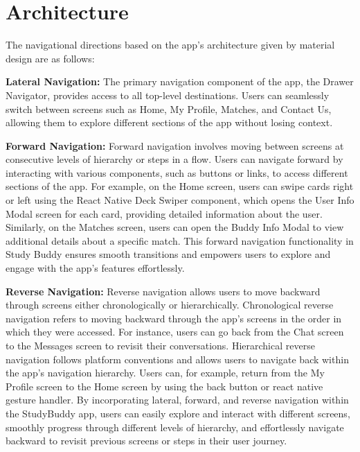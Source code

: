 \section{Architecture}\label{sec:nav_map}
The navigational directions based on the app's architecture given by material design\cite{navtypes} are as follows:
\begin{compactitem}
    \item \textbf{Lateral Navigation:} The primary navigation component of the app, the Drawer Navigator, provides access to all top-level destinations. Users can seamlessly switch between screens such as Home, My Profile, Matches, and Contact Us, allowing them to explore different sections of the app without losing context.
    \item \textbf{Forward Navigation:} Forward navigation involves moving between screens at consecutive levels of hierarchy or steps in a flow. Users can navigate forward by interacting with various components, such as buttons or links, to access different sections of the app. For example, on the Home screen, users can swipe cards right or left using the React Native Deck Swiper component, which opens the User Info Modal screen for each card, providing detailed information about the user. Similarly, on the Matches screen, users can open the Buddy Info Modal to view additional details about a specific match. This forward navigation functionality in Study Buddy ensures smooth transitions and empowers users to explore and engage with the app's features effortlessly.
    \item \textbf{Reverse Navigation:} Reverse navigation allows users to move backward through screens either chronologically or hierarchically. Chronological reverse navigation refers to moving backward through the app's screens in the order in which they were accessed. For instance, users can go back from the Chat screen to the Messages screen to revisit their conversations. Hierarchical reverse navigation follows platform conventions and allows users to navigate back within the app's navigation hierarchy. Users can, for example, return from the My Profile screen to the Home screen by using the back button or react native gesture handler.
    By incorporating lateral, forward, and reverse navigation within the StudyBuddy app, users can easily explore and interact with different screens, smoothly progress through different levels of hierarchy, and effortlessly navigate backward to revisit previous screens or steps in their user journey.
\end{compactitem}
